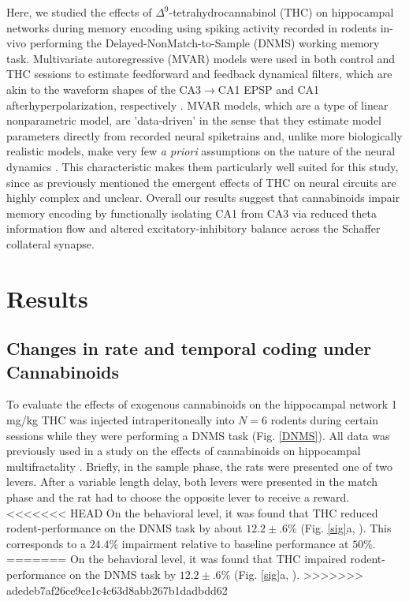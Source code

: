\documentclass[11pt,a4paper,final]{article}
\begin{document}
Here, we studied the effects of $\Delta^9$-tetrahydrocannabinol (THC) on hippocampal networks during memory encoding using spiking activity recorded in rodents in-vivo performing the Delayed-NonMatch-to-Sample (DNMS) working memory task.
Multivariate autoregressive (MVAR) models were used in both control and THC sessions to estimate feedforward and feedback dynamical filters, which are akin to the waveform shapes of the CA3$\to$CA1 EPSP and CA1 afterhyperpolarization, respectively \citep{sandler14}.
MVAR models, which are a type of linear nonparametric model, are 'data-driven' in the sense that they estimate model parameters directly from recorded neural spiketrains and, unlike more biologically realistic models, make very few \textit{a priori} assumptions on the nature of the neural dynamics \citep{marm04,song09par1}.
This characteristic makes them particularly well suited for this study, since as previously mentioned the emergent effects of THC on neural circuits are highly complex and unclear.
Overall our results suggest that cannabinoids impair memory encoding by functionally isolating CA1 from CA3 via reduced theta information flow and altered excitatory-inhibitory balance across the Schaffer collateral synapse.

\section{Results \label{results}}

    \subsection{Changes in rate and temporal coding under Cannabinoids}

To evaluate the effects of exogenous cannabinoids on the hippocampal network 1 mg/kg THC was injected intraperitoneally into $N=6$ rodents during certain sessions while they were performing a DNMS task (Fig. \ref{DNMS}).
All data was previously used in a study on the effects of cannabinoids on hippocampal multifractality \citep{dustin14,dustin15}.
Briefly, in the sample phase, the rats were presented one of two levers. 
After a variable length delay, both levers were presented in the match phase and the rat had to choose the opposite lever to receive a reward. 
<<<<<<< HEAD
On the behavioral level, it was found that THC reduced rodent-performance on the DNMS task by about $12.2\pm.6\%$ (Fig. \ref{sig}a, \citep{hampson00}).
This corresponds to a $24.4\%$ impairment relative to baseline performance at $50\%$.
=======
On the behavioral level, it was found that THC impaired rodent-performance on the DNMS task by $12.2\pm.6\%$ (Fig. \ref{sig}a, \citep{hampson00}).
>>>>>>> adedeb7af26ce9ce1c4c63d8abb267b1dadbdd62
\end{document}

